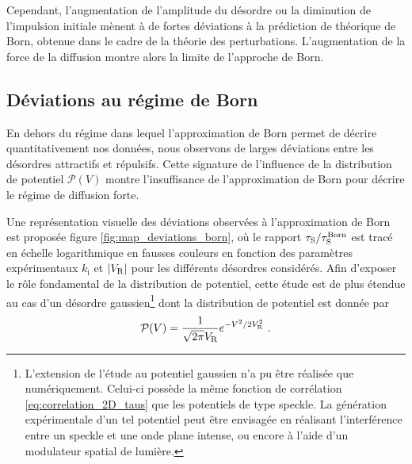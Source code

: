 Cependant, l'augmentation de l'amplitude du désordre ou la diminution de l'impulsion initiale mènent à de fortes déviations à la prédiction de théorique de Born, obtenue dans le cadre de la théorie des perturbations. L'augmentation de la force de la diffusion montre alors la limite de l'approche de Born.


\subsection{Déviations au régime de Born}
\label{sc:deviation_regime_born}
En dehors du régime dans lequel l'approximation de Born permet de décrire quantitativement nos données, nous observons de larges déviations entre les désordres attractifs et répulsifs. Cette signature de l'influence de la distribution de potentiel $\mathcal{P}(V)$ montre l'insuffisance de l'approximation de Born pour décrire le régime de diffusion forte.

Une représentation visuelle des déviations observées à l'approximation de Born est proposée figure \ref{fig:map_deviations_born}, où le rapport $\tau_{\mathrm{S}}/\tau_{\mathrm{S}}^{\mathrm{Born}}$ est tracé en échelle logarithmique en fausses couleurs en fonction des paramètres expérimentaux $k_{\mathrm{i}}$ et $|V_{\mathrm{R}}|$ pour les différents désordres considérés.  Afin d'exposer le rôle fondamental de la distribution de potentiel, cette étude est de plus étendue au cas d'un désordre gaussien\footnote{L'extension de l'étude au potentiel gaussien n'a pu être réalisée que numériquement. Celui-ci possède la même fonction de corrélation \ref{eq:correlation_2D_taus} que les potentiels de type speckle. La génération expérimentale d'un tel potentiel peut être envisagée en réalisant l'interférence entre un speckle et une onde plane intense, ou encore à l'aide d'un modulateur spatial de lumière.} dont la distribution de potentiel est donnée par
\begin{equation}
\mathcal{P}(V)=\frac{1}{\sqrt{2\pi} V_{\mathrm{R}}} e^{-V^2/2V_{\mathrm{R}}^2} \text{ .}
\end{equation}

